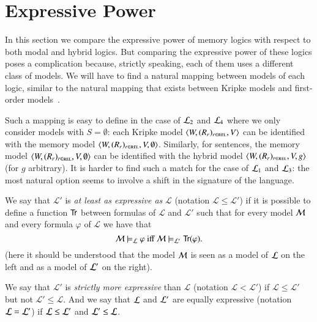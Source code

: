 \section{Expressive Power}\label{expressivity}

In this section we compare the expressive power of memory logics
with respect to both modal and hybrid logics.
But comparing the expressive power of these logics poses a complication
because, strictly speaking, each of them uses a different class of models.
We will have to find a natural mapping between models
of each logic, similar to the natural mapping that exists between
Kripke models and first-order models~\cite{BRV01}.

Such a mapping is easy to define in the case of $\mathcal{L}_2$ and $\mathcal{L}_4$ where we only consider models with $S=\emptyset$: each
Kripke model $\langle W,(R_r)_{r \in \textsc{rel}},V \rangle$ can be identified with the memory
model $\langle W,(R_r)_{r \in \textsc{rel}}, V, \emptyset \rangle$. Similarly, for sentences, the memory model $\langle W,(R_r)_{r \in \textsc{rel}},V,\emptyset \rangle$ can be identified with the hybrid model
$\langle W,(R_r)_{r \in \textsc{rel}},V,g \rangle$ (for $g$ arbitrary).
It is harder to find such a match for the case of $\mathcal{L}_1$ and $\mathcal{L}_3$: the most
natural option seems to involve a shift in the signature of the
language.

\begin{defn}
We say that
$\mathcal{L'}$ is \emph{at least as expressive as} $\mathcal{L}$
(notation $\mathcal{L} \le \mathcal{L'}$) if it is possible to
define a function ${\sf Tr}$ between formulas of  $\mathcal{L}$ and $\mathcal{L'}$
such that for every model $\mathcal{M}$ and every formula $\varphi$ of $\mathcal{L}$
we have that
$$
\mathcal{M} \models_\mathcal{L} \varphi \mbox{ iff } \mathcal{M} \models_{\mathcal{L}'} {\sf Tr}(\varphi).
$$
(here it should be understood that the model $\mathcal{M}$ is seen as a model of
$\mathcal{L}$ on the left and as a model of $\mathcal{L}'$ on the right).

We say that $\mathcal{L'}$ is \emph{strictly more expressive} than $\mathcal{L}$
(notation $\mathcal{L} < \mathcal{L'}$) if $\mathcal{L} \le \mathcal{L'}$ but
not $\mathcal{L}' \le \mathcal{L}$.  And we say that $\mathcal{L}$ and $\mathcal{L}'$ are equally
expressive (notation $\mathcal{L} = \mathcal{L}'$) if $\mathcal{L} \le \mathcal{L}'$ and $\mathcal{L}' \le \mathcal{L}$.
\end{defn}

